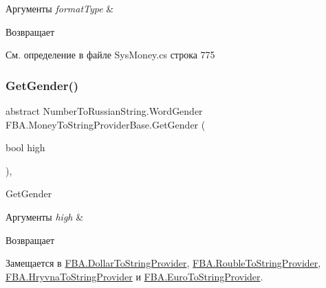 \begin{DoxyParams}{Аргументы}
{\em format\+Type} & \\
\hline
\end{DoxyParams}
\begin{DoxyReturn}{Возвращает}

\end{DoxyReturn}


См. определение в файле Sys\+Money.\+cs строка 775

\mbox{\label{class_f_b_a_1_1_money_to_string_provider_base_a24e1e1dcd1a4c42773d3ec0034a4ca6d}} 
\subsubsection{\texorpdfstring{Get\+Gender()}{GetGender()}}
{\footnotesize\ttfamily abstract Number\+To\+Russian\+String.\+Word\+Gender F\+B\+A.\+Money\+To\+String\+Provider\+Base.\+Get\+Gender (\begin{DoxyParamCaption}\item[{bool}]{high }\end{DoxyParamCaption})\hspace{0.3cm}{\ttfamily [protected]}, {}}



Get\+Gender 


\begin{DoxyParams}{Аргументы}
{\em high} & \\
\hline
\end{DoxyParams}
\begin{DoxyReturn}{Возвращает}

\end{DoxyReturn}


Замещается в \mbox{\hyperlink{class_f_b_a_1_1_dollar_to_string_provider_a9eb995705420a105f5d0d6b7fb48fc90}{F\+B\+A.\+Dollar\+To\+String\+Provider}}, \mbox{\hyperlink{class_f_b_a_1_1_rouble_to_string_provider_ae13f3d59cbca7fff82d3a20ad4e8b0d0}{F\+B\+A.\+Rouble\+To\+String\+Provider}}, \mbox{\hyperlink{class_f_b_a_1_1_hryvna_to_string_provider_a7ba51229f701710f4aaa09db9cbfd3e4}{F\+B\+A.\+Hryvna\+To\+String\+Provider}} и \mbox{\hyperlink{class_f_b_a_1_1_euro_to_string_provider_aa2224b2f6f00b6f980ab4022b1db688c}{F\+B\+A.\+Euro\+To\+String\+Provider}}.

